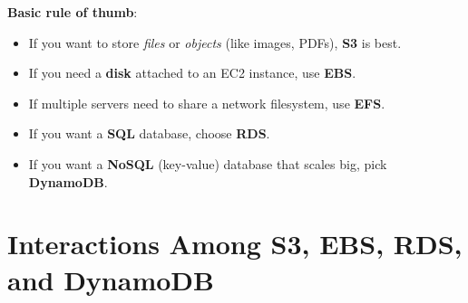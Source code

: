 \documentclass[12pt]{article}
\begin{document}
\noindent
\textbf{Basic rule of thumb}:
\begin{itemize}
    \item If you want to store \textit{files} or \textit{objects} (like images, PDFs), \textbf{S3} is best.
    \item If you need a \textbf{disk} attached to an EC2 instance, use \textbf{EBS}.
    \item If multiple servers need to share a network filesystem, use \textbf{EFS}.
    \item If you want a \textbf{SQL} database, choose \textbf{RDS}.
    \item If you want a \textbf{NoSQL} (key-value) database that scales big, pick \textbf{DynamoDB}.
\end{itemize}

\clearpage

\section{Interactions Among S3, EBS, RDS, and DynamoDB}
\end{document}
